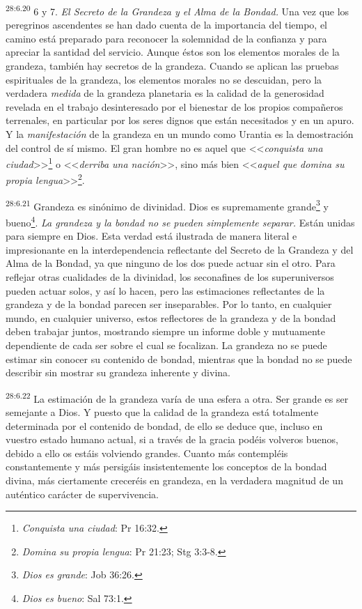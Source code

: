 \par
\textsuperscript{28:6.20} 6 y 7. \textit{El Secreto de la Grandeza y el Alma de la Bondad.} Una vez que los peregrinos ascendentes se han dado cuenta de la importancia del tiempo, el camino está preparado para reconocer la solemnidad de la confianza y para apreciar la santidad del servicio. Aunque éstos son los elementos morales de la grandeza, también hay secretos de la grandeza. Cuando se aplican las pruebas espirituales de la grandeza, los elementos morales no se descuidan, pero la verdadera \textit{medida} de la grandeza planetaria es la calidad de la generosidad revelada en el trabajo desinteresado por el bienestar de los propios compañeros terrenales, en particular por los seres dignos que están necesitados y en un apuro. Y la \textit{manifestación} de la grandeza en un mundo como Urantia es la demostración del control de sí mismo. El gran hombre no es aquel que <<\textit{conquista una ciudad}>>\footnote{\textit{Conquista una ciudad}: Pr 16:32.} o <<\textit{derriba una nación}>>, sino más bien <<\textit{aquel que domina su propia lengua}>>\footnote{\textit{Domina su propia lengua}: Pr 21:23; Stg 3:3-8.}.

\par
\textsuperscript{28:6.21} Grandeza es sinónimo de divinidad. Dios es supremamente grande\footnote{\textit{Dios es grande}: Job 36:26.} y bueno\footnote{\textit{Dios es bueno}: Sal 73:1.}. \textit{La grandeza y la bondad no se pueden simplemente separar.} Están unidas para siempre en Dios. Esta verdad está ilustrada de manera literal e impresionante en la interdependencia reflectante del Secreto de la Grandeza y del Alma de la Bondad, ya que ninguno de los dos puede actuar sin el otro. Para reflejar otras cualidades de la divinidad, los seconafines de los superuniversos pueden actuar solos, y así lo hacen, pero las estimaciones reflectantes de la grandeza y de la bondad parecen ser inseparables. Por lo tanto, en cualquier mundo, en cualquier universo, estos reflectores de la grandeza y de la bondad deben trabajar juntos, mostrando siempre un informe doble y mutuamente dependiente de cada ser sobre el cual se focalizan. La grandeza no se puede estimar sin conocer su contenido de bondad, mientras que la bondad no se puede describir sin mostrar su grandeza inherente y divina.

\par
\textsuperscript{28:6.22} La estimación de la grandeza varía de una esfera a otra. Ser grande es ser semejante a Dios. Y puesto que la calidad de la grandeza está totalmente determinada por el contenido de bondad, de ello se deduce que, incluso en vuestro estado humano actual, si a través de la gracia podéis volveros buenos, debido a ello os estáis volviendo grandes. Cuanto más contempléis constantemente y más persigáis insistentemente los conceptos de la bondad divina, más ciertamente creceréis en grandeza, en la verdadera magnitud de un auténtico carácter de supervivencia.

